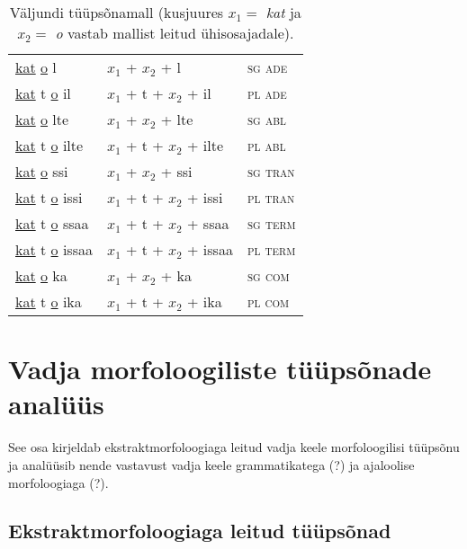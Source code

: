 \documentclass[12pt,a4paper]{article}
\begin{document}
\begin{table}[H]
\begin{minipage}[t]{.55\textwidth}
\begin{tabular}[t]{l l l}
      \underline{kat}   \underline{o} l     & $x_1$ + $x_2$ + l         & \textsc{sg ade} \\
      \underline{kat} t \underline{o} il    & $x_1$ + t + $x_2$ + il    & \textsc{pl ade} \\
      \underline{kat}   \underline{o} lte   & $x_1$ + $x_2$ + lte       & \textsc{sg abl} \\
      \underline{kat} t \underline{o} ilte  & $x_1$ + t + $x_2$ + ilte  & \textsc{pl abl} \\
      \underline{kat}   \underline{o} ssi   & $x_1$ + $x_2$ + ssi       & \textsc{sg tran} \\
      \underline{kat} t \underline{o} issi  & $x_1$ + t + $x_2$ + issi  & \textsc{pl tran} \\
      \underline{kat} t \underline{o} ssaa  & $x_1$ + t + $x_2$ + ssaa  & \textsc{sg term} \\
      \underline{kat} t \underline{o} issaa & $x_1$ + t + $x_2$ + issaa & \textsc{pl term} \\
      \underline{kat}   \underline{o} ka    & $x_1$ + $x_2$ + ka        & \textsc{sg com} \\
      \underline{kat} t \underline{o} ika   & $x_1$ + t + $x_2$ + ika   & \textsc{pl com} \\
    \end{tabular}
    \caption{Väljundi tüüpsõnamall (kus\-juures $x_1 = $ \textit{kat} ja $x_2 = $ \textit{o} vastab mallist leitud ühisosajadale).}
    \label{tab:väljundtabel_katto}
  \end{minipage}
\end{table}








\newpage
\section{Vadja morfoloogiliste tüüpsõnade analüüs}
\label{sec:analüüs}

See osa kirjeldab ekstraktmorfoloogiaga leitud vadja keele morfoloogilisi tüüpsõnu ja analüüsib nende vastavust vadja keele grammatikatega (?) ja ajaloolise morfoloogiaga (?).



\subsection{Ekstraktmorfoloogiaga leitud tüüpsõnad}
\end{document}

